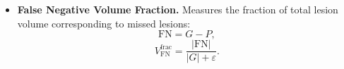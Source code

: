 \begin{itemize}
    \item \textbf{False Negative Volume Fraction.} Measures the fraction
    of total lesion volume corresponding to missed lesions:
    \begin{equation}
    \mathrm{FN} = G - P,
    \end{equation}
    \begin{equation}
    V_{\mathrm{FN}}^{\mathrm{frac}}
    =
    \frac{|\mathrm{FN}|}{|G| + \varepsilon}.
    \end{equation}
\end{itemize}

